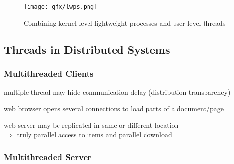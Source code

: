 \begin{figure}[h]
	\centering
	\texttt{[image: gfx/lwps.png]}
	\caption{Combining kernel-level lightweight processes and user-level threads}
	\label{img:lwps}
\end{figure}

\subsection{Threads in Distributed Systems}

\subsubsection{Multithreaded Clients}

\begin{compactitem}
	\item multiple thread may hide communication delay (distribution transparency)
	\item web browser opens several connections to load parts of a document/page
	\item web server may be replicated in same or different location\\
	$\Rightarrow$ truly parallel access to items and parallel download
\end{compactitem}

\subsubsection{Multithreaded Server}

